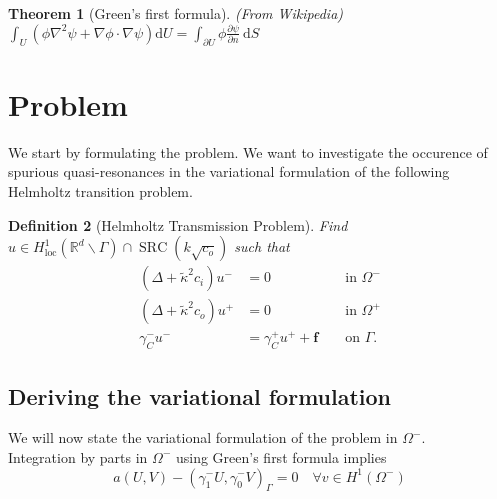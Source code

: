 \documentclass[10pt,journal,compsoc, onecolumn]{IEEEtran}
\newtheorem{theorem}{Theorem}[section]
\newtheorem{definition}[theorem]{Definition}
\begin{document}
\begin{theorem}[Green's first formula]
    (From Wikipedia)
    \(\int_{U}\left(\phi \nabla^{2} \psi+\nabla \phi \cdot \nabla \psi\right) \mathrm{d} U=\int_{\partial U} \phi \frac{\partial \psi}{\partial n} \mathrm{~d} S\)
\end{theorem}
\newpage
\section{Problem }
We start by formulating the problem. We want to investigate the occurence of spurious quasi-resonances in the variational formulation of the following Helmholtz transition problem.

\begin{definition}[Helmholtz Transmission Problem]
Find \(u \in H_{\operatorname{loc}}^{1}\left(\mathbb{R}^{d} \backslash \Gamma\right) \cap \operatorname{SRC}\left(k \sqrt{c_{o}}\right)\) 
such that
$$
\begin{aligned}
    \left(\Delta+\tilde\kappa^{2} c_{i}\right) u^{-} &=0 & & \text { in } \Omega^{-} 
    \\\left(\Delta+\tilde\kappa^{2} c_{o}\right) u^{+} &=0 & & \text { in } \Omega^{+} 
    \\ \gamma_{C}^{-} u^{-} &=\gamma_{C}^{+} u^{+}+\mathbf{f} & & \text { on } \Gamma.
\end{aligned}
$$
\end{definition}

\subsection{Deriving the variational formulation}
We will now state the variational formulation of the problem in $\Omega^-$. \\
Integration by parts in $\Omega^-$ using Green's first formula implies 
$$
a(U, V) - \left(\gamma_{1}^{-} U, \gamma_{0}^{-} V\right)_{\Gamma}=0 \quad \forall v \in H^{1}\left(\Omega^{-}\right)
$$
\end{document}
